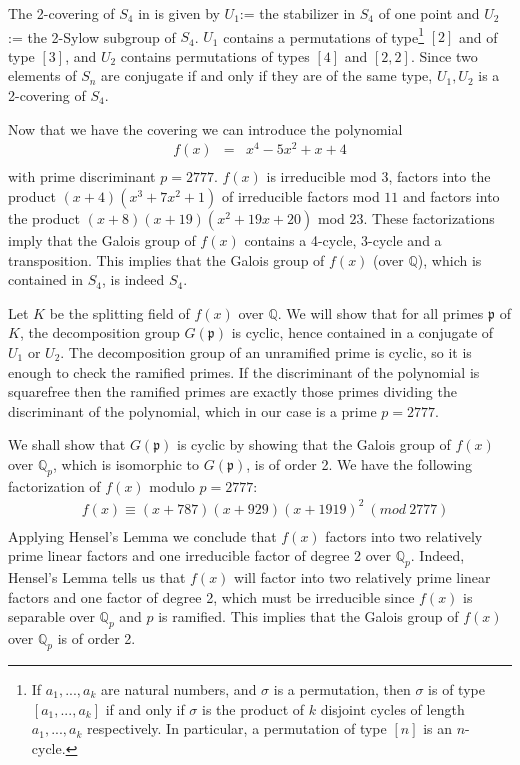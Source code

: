 \documentclass[reqno,12pt]{amsart}
\theoremstyle{remark}
\theoremstyle{definition}
\theoremstyle{citing}
\numberwithin{theorem}{section}
\numberwithin{equation}{section}
\begin{document}
The 2-covering of $S_{4}$ in \cite{BBH} is
given by $U_{1}$:= the stabilizer in $S_{4}$ of one
point and $U_{2}$:= the 2-Sylow subgroup of $S_{4}$.  $U_{1}$ contains a permutations of type\footnote{If $a_{1},...,a_{k}$ are natural numbers, and $\sigma$ is a permutation, then $\sigma$ is of type $[a_{1},...,a_{k}]$ if and only if $\sigma$ is the product of $k$ disjoint cycles
of length $a_{1},...,a_{k}$ respectively. In particular, a permutation of type $[n]$ is an $n$-cycle.} $[2]$ and  of type $[3]$, and $U_{2}$ contains  permutations of
types $[4]$ and $[2,2]$. Since two elements of $S_{n}$
are conjugate if and only if they are of the same type, $U_1,U_2$ is a 2-covering of $S_4$.

Now that we have the covering we can introduce the polynomial
\begin{eqnarray*}
f(x) & = & x^{4}-5x^{2}+x+4\\
\end{eqnarray*}
 with prime discriminant  $p=2777$.  $f(x)$ is irreducible mod
$3$, factors into the product $(x+4)(x^{3}+7x^{2}+1)$ of irreducible
factors mod $11$ and factors into the product $(x+8)(x+19)(x^{2}+19x+20)$
mod $23$. These factorizations imply that the Galois group of $f(x)$
contains a 4-cycle, 3-cycle and a transposition. This implies that
the Galois group of $f(x)$ (over ${{\mathbb{{Q}}}}$), which is contained in $S_{4}$, is indeed
$S_{4}$.

Let $K$ be the splitting field of $f(x)$ over ${{\mathbb{{Q}}}}$. We will show that for all primes $\mathfrak{p}$ of $K$, the
decomposition group $G(\mathfrak{p})$
is cyclic, hence contained in a conjugate of $U_{1}$ or $U_{2}$.
The decomposition group of an unramified prime is cyclic, so it
is enough to check the ramified primes. If the
discriminant of the polynomial is squarefree then the ramified primes
are exactly those primes dividing the discriminant of the polynomial, which in our case is a prime $p=2777$.

We shall show that $G(\mathfrak{p})$ is cyclic  by showing that the Galois group of $f(x)$ over $\mathbb{Q}_{p}$, which is isomorphic to $G(\mathfrak{p})$,
is of order 2. We have the following factorization of $f(x)$ modulo  $p=2777$: \begin{eqnarray*}
 & f(x)\equiv(x+787)(x+929)(x+1919)^{2}\ (mod\ 2777)\\
\end{eqnarray*}
Applying Hensel's Lemma we conclude that $f(x)$ factors into two
relatively prime linear factors and one irreducible factor of degree
2 over $\mathbb{Q}_{p}$. Indeed, Hensel's Lemma tells us that $f(x)$
will factor into two relatively prime linear factors and one factor
of degree 2, which must be irreducible since
$f(x)$ is separable over $\mathbb{Q}_p$ and $p$ is ramified. This implies that the Galois
group of $f(x)$ over $\mathbb{Q}_{p}$ is of order 2.
\end{document}
